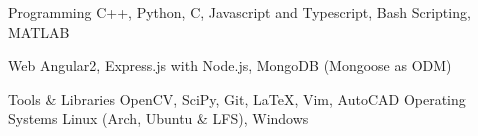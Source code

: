 \begin{cvskills}

  \cvskill
  {Programming}
		{C++, Python, C, Javascript and Typescript, Bash Scripting, MATLAB}

  \cvskill
  {Web}
		{Angular2, Express.js with Node.js, MongoDB (Mongoose as ODM)}

  \cvskill
		{Tools \& Libraries}
	{OpenCV, SciPy, Git, \LaTeX, Vim, AutoCAD}
		\cvskill
		{Operating Systems}
		{Linux (Arch, Ubuntu \& LFS), Windows}
\end{cvskills}

